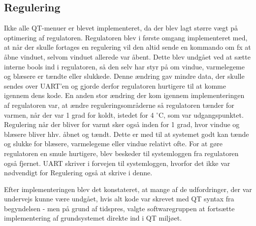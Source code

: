 \subsection{Regulering}

Ikke alle QT-menuer er blevet implementeret, da der blev lagt større vægt på optimering af regulatoren. 
Regulatoren blev i første omgang implementeret med, at når der skulle fortages en regulering vil den altid sende en kommando om fx at åbne vinduet, selvom vinduet allerede var åbent. 
Dette blev undgået ved at sætte interne bools ind i regulatoren, så den selv har styr på om vindue, varmelegeme og blæsere er tændte eller slukkede. 
Denne ændring gav mindre data, der skulle sendes over UART'en og gjorde derfor regulatoren hurtigere til at komme igennem dens kode.
En anden stor ændring der kom igennem implementeringen af regulatoren var, at ændre reguleringsområderne så regulatoren tænder for varmen, når der var 1 grad for koldt, istedet for 4 $^{\circ}$C, som var udgangspunktet. 
Regulering når der bliver for varmt sker også inden for 1 grad, hvor vindue og blæsere bliver hhv. åbnet og tændt. 
Dette er med til at systemet godt kan tænde og slukke for blæsere, varmelegeme eller vindue relativt ofte.
For at gøre regulatoren en smule hurtigere, blev beskeder til systemloggen fra regulatoren også fjernet. 
UART skriver i forvejen til systemloggen, hvorfor det ikke var nødvendigt for Regulering også at skrive i denne.

\mbox{}

Efter implementeringen blev det konstateret, at mange af de udfordringer, der var undervejs kunne være undgået, hvis alt kode var skrevet med QT syntax fra begyndelsen - men på grund af tidspres, valgte softwaregruppen at fortsætte implementering af grundsystemet direkte ind i QT miljøet.

\clearpage